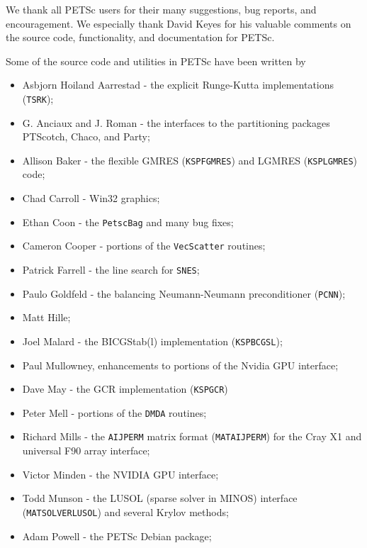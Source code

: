 %
%

\medskip \medskip \noindent
We thank all PETSc users for their many suggestions, bug reports, and
encouragement.  We especially thank David Keyes
for his valuable comments on the source code,
functionality, and documentation for PETSc.


\vspace{.3in}
\noindent
Some of the source code and utilities in PETSc
have been written by
\begin{itemize}
  \item Asbjorn Hoiland Aarrestad - the explicit Runge-Kutta implementations (\lstinline{TSRK});
  \item G. Anciaux and J. Roman - the interfaces to the partitioning packages PTScotch, Chaco, and Party;
  \item Allison Baker - the flexible GMRES (\lstinline{KSPFGMRES}) and LGMRES (\lstinline{KSPLGMRES}) code;
  \item Chad Carroll - Win32 graphics;
  \item Ethan Coon - the \lstinline{PetscBag} and many bug fixes;
  \item Cameron Cooper - portions of the \lstinline{VecScatter} routines;
  \item Patrick Farrell - the  line search for \lstinline{SNES};
  \item Paulo Goldfeld - the balancing Neumann-Neumann preconditioner (\lstinline{PCNN});
  \item Matt Hille;
  \item Joel Malard - the BICGStab(l) implementation (\lstinline{KSPBCGSL});
  \item Paul Mullowney, enhancements to portions of the Nvidia GPU interface;
  \item Dave May - the GCR implementation (\lstinline{KSPGCR})
  \item Peter Mell - portions of the \lstinline{DMDA} routines;
  \item Richard Mills - the \lstinline{AIJPERM} matrix format (\lstinline{MATAIJPERM}) for the Cray X1 and universal F90 array interface;
  \item Victor Minden - the NVIDIA GPU interface;
  \item Todd Munson - the LUSOL (sparse solver in MINOS) interface (\lstinline{MATSOLVERLUSOL}) and several Krylov methods;
  \item Adam Powell - the PETSc Debian package;

\end{itemize}
